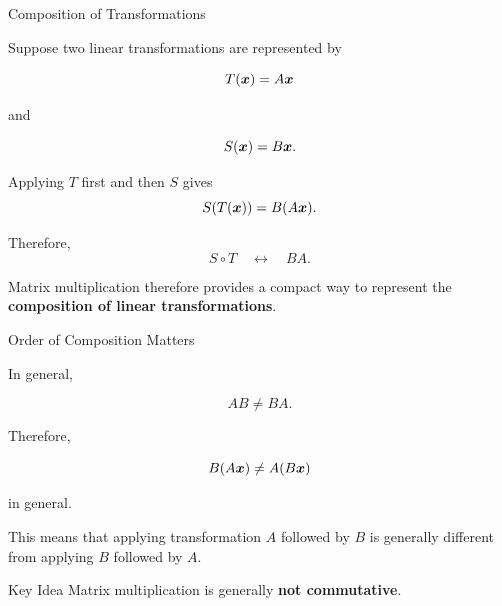 
\begin{frame}{Composition of Transformations}

Suppose two linear transformations are represented by

\[
T(\bm{x})=A\bm{x}
\]

and

\[
S(\bm{x})=B\bm{x}.
\]

Applying $T$ first and then $S$ gives
\vspace{-0.1cm}
\[
S(T(\bm{x}))
=
B(A\bm{x}).
\]

Therefore,
\vspace{-0.1cm}
\[
\boxed{
S\circ T
\quad\longleftrightarrow\quad
BA.
}
\]
\vspace{-0.1cm}

Matrix multiplication therefore provides a compact way to
represent the \textbf{composition of linear transformations}.

\end{frame}



\begin{frame}{Order of Composition Matters}

In general,

\[
\boxed{
AB\neq BA.
}
\]

Therefore,

\[
B(A\bm{x})
\neq
A(B\bm{x})
\]

in general.

\vspace{0.5cm}

This means that applying transformation $A$ followed by $B$
is generally different from applying $B$ followed by $A$.

\vspace{0.4cm}

\begin{block}{Key Idea}
Matrix multiplication is generally \textbf{not commutative}.
\end{block}

\end{frame}



